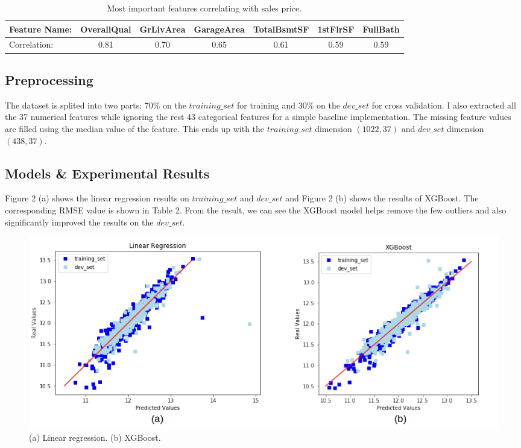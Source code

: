 \documentclass{article} %
\begin{document}
\begin{table}[h]
	\begin{center}
		\begin{tabular}{|l|cccccc|}
			\hline
			Feature Name: &
			OverallQual &
			GrLivArea &
			GarageArea &
			TotalBsmtSF &
			1stFlrSF &
			FullBath \\
			\hline
			Correlation: &
			0.81 &
			0.70 &
			0.65 &
			0.61 &
			0.59 &
			0.59 \\
			\hline
		\end{tabular}
	\end{center}
	\caption{Most important features correlating with sales price.}
\end{table}

\subsection{Preprocessing}

The dataset is splited into two parts: 70\% on the $training\_set$ for training
and 30\% on the $dev\_set$ for cross validation.
I also extracted all the 37 numerical features while ignoring the
rest 43 categorical features for a simple baseline implementation.
The missing feature values are filled using the median value of the feature.
This ends up with the $training\_set$ dimension $(1022, 37)$ and $dev\_set$ dimension $(438, 37)$.

\subsection{Models \& Experimental Results}

Figure 2 (a) shows the linear regression results \cite{lr} on $training\_set$ and $dev\_set$
and Figure 2 (b) shows the results of XGBoost\cite{xgboost}.
The corresponding RMSE value is shown in Table 2.
From the result, we can see the XGBoost model helps remove the few outliers
and also significantly improved the results on the $dev\_set$.

\begin{figure}[h]
	\begin{center}
		\includegraphics[width=1\linewidth]{fig/exp.png}
	\end{center}
	\caption{(a) Linear regression. (b) XGBoost.}
	\label{fig:long}
	\label{fig:onecol}
\end{figure}
\end{document}
